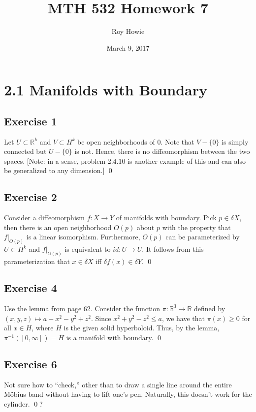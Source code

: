 \documentclass{article}
\newcommand{\R}{\mathbb{R}}
\begin{document}
\title{\vspace{-2cm}MTH 532 Homework 7}
\author{Roy Howie}
\date{March 9, 2017}
\maketitle

\section*{2.1 Manifolds with Boundary}
  \subsection*{Exercise 1}
    Let $U\subset\R^k$ and $V\subset H^k$ be open neighborhoods of 0. Note that
    $V-\{0\}$ is simply connected but $U-\{0\}$ is not. Hence, there is no
    diffeomorphism between the two spaces. [Note: in a sense, problem 2.4.10 is
    another example of this and can also be generalized to any dimension.]
    \qed

  \subsection*{Exercise 2}
    Consider a diffeomorphism $f\colon X\to Y$ of manifolds with boundary. Pick
    $p\in\delta X$, then there is an open neighborhood $O(p)$ about $p$ with the
    property that $f|_{O(p)}$ is a linear isomorphism. Furthermore, $O(p)$ can
    be parameterized by $U\subset H^k$ and $f|_{O(p)}$ is equivalent to $id
    \colon U\to U$. It follows from this parameterization that $x\in\delta X$
    iff $\delta f(x)\in\delta Y$.
    \qed

  \subsection*{Exercise 4}
    Use the lemma from page 62. Consider the function $\pi\colon\R^3\to\R$
    defined by $(x,y,z)\mapsto a-x^2-y^2+z^2$. Since $x^2+y^2-z^2\leq a$, we
    have that $\pi(x)\geq0$ for all $x\in H$, where $H$ is the given solid
    hyperboloid. Thus, by the lemma, $\pi^{-1}([0,\infty])=H$ is a manifold with
    boundary.
    \qed

  \subsection*{Exercise 6}
    Not sure how to ``check,'' other than to draw a single line around the
    entire Möbius band without having to lift one's pen. Naturally, this doesn't
    work for the cylinder.
    \qed?
\end{document}
